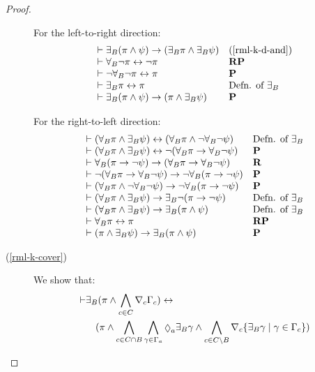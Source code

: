 \begin{proof}
\begin{description}
    For the left-to-right direction:
    $$
    \begin{array}{ll}
        \vdash {\exists_{B}} (\pi \land \psi) \rightarrow ({\exists_{B}} \pi \land {\exists_{B}} \psi) & (\ref{rml-k-d-and})\\
        \vdash {\forall_{B}} \lnot \pi \leftrightarrow \lnot \pi & {\bf RP}\\
        \vdash \lnot {\forall_{B}} \lnot \pi \leftrightarrow \pi & {\bf P}\\
        \vdash {\exists_{B}} \pi \leftrightarrow \pi & \text{Defn. of ${\exists_{B}}$}\\
        \vdash {\exists_{B}} (\pi \land \psi) \rightarrow (\pi \land {\exists_{B}} \psi) & {\bf P}
    \end{array}
    $$

    For the right-to-left direction:
    $$
    \begin{array}{ll}
        \vdash ({\forall_{B}} \pi \land {\exists_{B}} \psi) \leftrightarrow ({\forall_{B}} \pi \land \lnot {\forall_{B}} \lnot \psi)& \text{Defn. of ${\exists_{B}}$}\\
        \vdash ({\forall_{B}} \pi \land {\exists_{B}} \psi) \leftrightarrow \lnot ({\forall_{B}} \pi \rightarrow {\forall_{B}} \lnot \psi)& {\bf P}\\
        \vdash {\forall_{B}} (\pi \rightarrow \lnot \psi) \rightarrow ({\forall_{B}} \pi \rightarrow {\forall_{B}} \lnot \psi)& {\bf R}\\
        \vdash \lnot ({\forall_{B}} \pi \rightarrow {\forall_{B}} \lnot \psi) \rightarrow \lnot {\forall_{B}} (\pi \rightarrow \lnot \psi)& {\bf P}\\
        \vdash ({\forall_{B}} \pi \land \lnot {\forall_{B}} \lnot \psi) \rightarrow \lnot {\forall_{B}} (\pi \rightarrow \lnot \psi)& {\bf P}\\
        \vdash ({\forall_{B}} \pi \land {\exists_{B}} \psi) \rightarrow {\exists_{B}} \lnot (\pi \rightarrow \lnot \psi)& \text{Defn. of ${\exists_{B}}$}\\
        \vdash ({\forall_{B}} \pi \land {\exists_{B}} \psi) \rightarrow {\exists_{B}} (\pi \land \psi)& \text{Defn. of ${\exists_{B}}$}\\
        \vdash {\forall_{B}} \pi \leftrightarrow \pi & {\bf RP}\\
        \vdash (\pi \land {\exists_{B}} \psi) \rightarrow {\exists_{B}} (\pi \land \psi)& {\bf P}\\
    \end{array}
    $$

    \item[(\ref{rml-k-cover})]
    We show that:
    \begin{align*}
        \proves & \displaystyle \somerefsBs (\pi \land \bigwedge_{\agentC \in \agentsC} \coverC \Gamma_\agentC) \iff \\&\quad
            (
            \pi \land
            \bigwedge_{\agentC \in \agentsC \cap \agentsB} \bigwedge_{\gamma \in \Gamma_\agentA} \possibleA \somerefsBs \gamma \land
            \bigwedge_{\agentC \in \agentsC \setminus \agentsB} \coversC \{\somerefsBs \gamma \mid \gamma \in \Gamma_\agentC\} 
            )
    \end{align*}


\end{description}
\end{proof}
